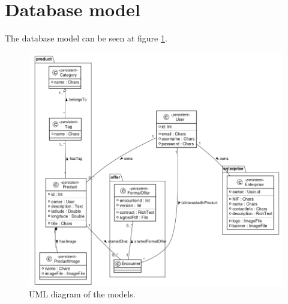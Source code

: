 \documentclass[./main.tex]{subfiles}
\begin{document}

\section{Database model}
The database model can be seen at figure \ref{fig:model-uml}.
\begin{figure}[H]
\centering
\includegraphics[width=\linewidth]{img/database-model-new.png}
\caption{UML diagram of the models.}
\label{fig:model-uml}
\end{figure}
\end{document}
